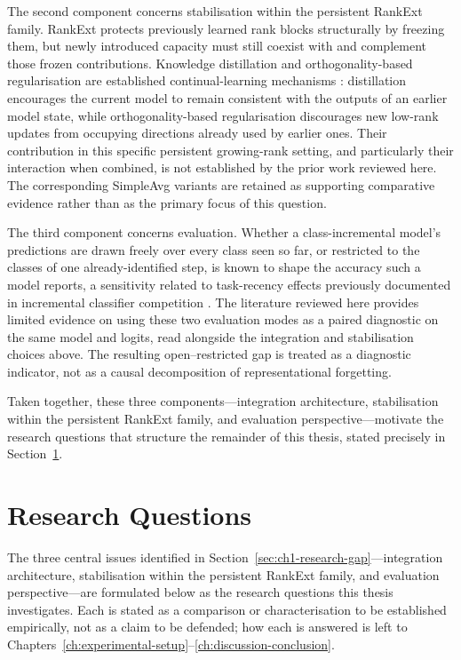 The second component concerns stabilisation within the persistent RankExt
family. RankExt protects previously learned rank blocks structurally by
freezing them, but newly introduced capacity must still coexist with and
complement those frozen contributions. Knowledge distillation and
orthogonality-based regularisation are established continual-learning
mechanisms \parencite{li2016learning,wang2023orthogonal}: distillation
encourages the current model to remain consistent with the outputs of an
earlier model state, while orthogonality-based regularisation discourages
new low-rank updates from occupying directions already used by earlier
ones. Their contribution in this specific persistent growing-rank setting,
and particularly their interaction when combined, is not established by
the prior work reviewed here. The corresponding SimpleAvg variants are
retained as supporting comparative evidence rather than as the primary
focus of this question.

The third component concerns evaluation. Whether a class-incremental
model's predictions are drawn freely over every class seen so far, or
restricted to the classes of one already-identified step, is known to
shape the accuracy such a model reports, a sensitivity related to
task-recency effects previously documented in incremental classifier
competition \parencite{wu2019large}. The literature reviewed here provides
limited evidence on using these two evaluation modes as a paired
diagnostic on the same model and logits, read alongside the integration
and stabilisation choices above. The resulting open--restricted gap is
treated as a diagnostic indicator, not as a causal decomposition of
representational forgetting.

Taken together, these three components---integration architecture,
stabilisation within the persistent RankExt family, and evaluation
perspective---motivate the research questions that structure the remainder
of this thesis, stated precisely in
Section~\ref{sec:ch1-research-questions}.

\section{Research Questions}
\label{sec:ch1-research-questions}

The three central issues identified in
Section~\ref{sec:ch1-research-gap}---integration architecture,
stabilisation within the persistent RankExt family, and evaluation
perspective---are formulated below as the research questions this thesis
investigates. Each is stated as a comparison or characterisation to be
established empirically, not as a claim to be defended; how each is
answered is left to
Chapters~\mbox{\ref{ch:experimental-setup}--\ref{ch:discussion-conclusion}}.

